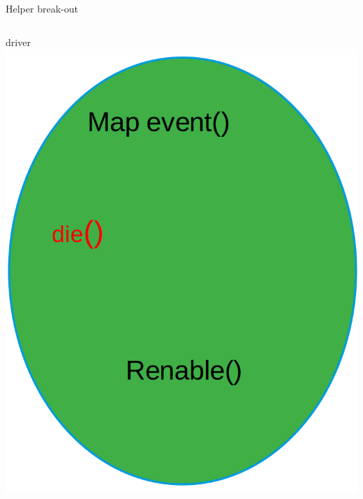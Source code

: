 \documentclass[10pt]{beamer}
\begin{document}
\begin{frame}[t]{Helper break-out}
\begin{columns}[onlytextwidth]
{	}
	driver \\[4pt]
	\includegraphics[width=1\linewidth]{img/isr/driver_size.png}
	\end{columns}
\end{frame}


\end{document}
